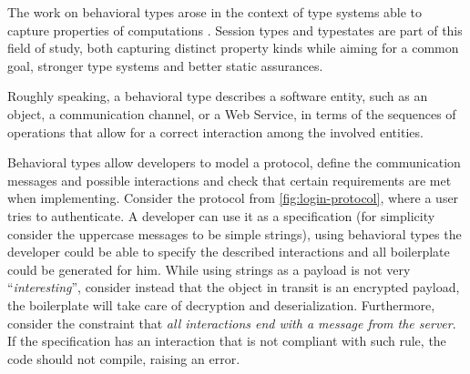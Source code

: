 The work on behavioral types arose in the context of type systems able to capture properties of computations \autocite{Huttel2016}.
Session types and typestates are part of this field of study,
both capturing distinct property kinds while aiming for a common goal,
stronger type systems and better static assurances.

\begin{displayquote}
    Roughly speaking, a behavioral type describes a software entity, such as an object, a communication channel,
    or a Web Service, in terms of the sequences of operations that allow for a correct interaction among the involved entities.
\end{displayquote}

Behavioral types allow developers to model a protocol,
define the communication messages and possible interactions and
check that certain requirements are met when implementing.
Consider the protocol from \autoref{fig:login-protocol},
where a user tries to authenticate.
A developer can use it as a specification
(for simplicity consider the uppercase messages to be simple strings),
using behavioral types the developer could be able to specify the described interactions and all boilerplate could be generated for him.
While using strings as a payload is not very “\emph{interesting}”,
consider instead that the object in transit is an encrypted payload,
the boilerplate will take care of decryption and deserialization.
Furthermore, consider the constraint that \emph{all interactions end with a message from the server}.
If the specification has an interaction that is not compliant with such rule,
the code should not compile, raising an error.

